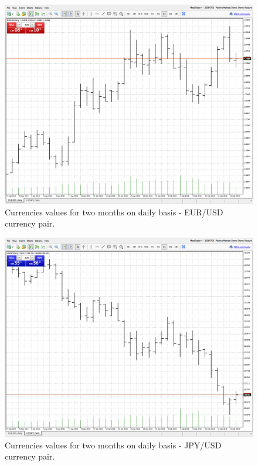\documentclass{llncs}
\begin{document}
\begin{figure}
  \includegraphics[width=1.0\linewidth]{fig01}
  \caption{Currencies values for two months on daily basis - EUR/USD currency pair.}
  \label{fig01}
\end{figure}
\FloatBarrier

\begin{figure}
  \includegraphics[width=1.0\linewidth]{fig02}
  \caption{Currencies values for two months on daily basis - JPY/USD currency pair.}
  \label{fig02}
\end{figure}
\FloatBarrier
\end{document}
